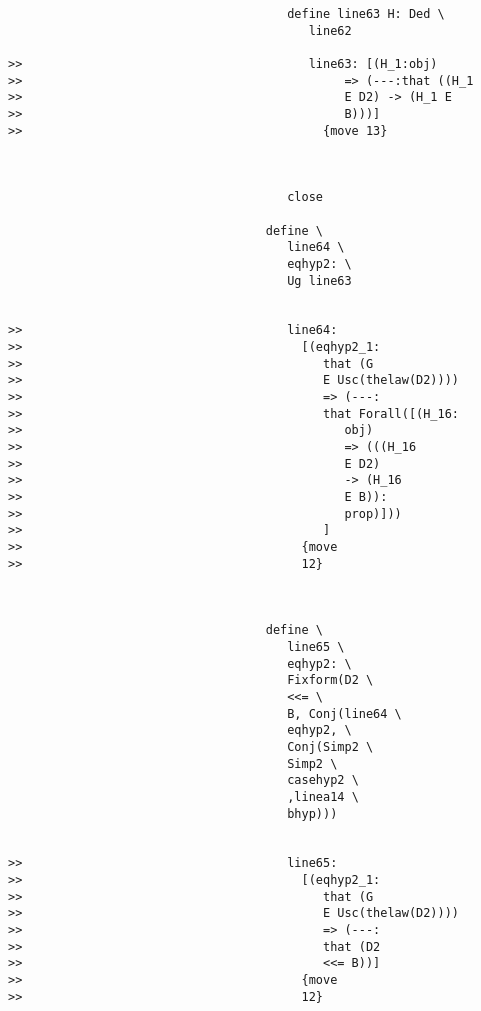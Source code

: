 \documentclass[12pt]{article}
\begin{document}
\begin{verbatim}
                                       define line63 H: Ded \
                                          line62

>>                                        line63: [(H_1:obj)
>>                                             => (---:that ((H_1
>>                                             E D2) -> (H_1 E
>>                                             B)))]
>>                                          {move 13}



                                       close

                                    define \
                                       line64 \
                                       eqhyp2: \
                                       Ug line63


>>                                     line64:
>>                                       [(eqhyp2_1:
>>                                          that (G
>>                                          E Usc(thelaw(D2))))
>>                                          => (---:
>>                                          that Forall([(H_16:
>>                                             obj)
>>                                             => (((H_16
>>                                             E D2)
>>                                             -> (H_16
>>                                             E B)):
>>                                             prop)]))
>>                                          ]
>>                                       {move
>>                                       12}



                                    define \
                                       line65 \
                                       eqhyp2: \
                                       Fixform(D2 \
                                       <<= \
                                       B, Conj(line64 \
                                       eqhyp2, \
                                       Conj(Simp2 \
                                       Simp2 \
                                       casehyp2 \
                                       ,linea14 \
                                       bhyp)))


>>                                     line65:
>>                                       [(eqhyp2_1:
>>                                          that (G
>>                                          E Usc(thelaw(D2))))
>>                                          => (---:
>>                                          that (D2
>>                                          <<= B))]
>>                                       {move
>>                                       12}




\end{verbatim}
\end{document}
